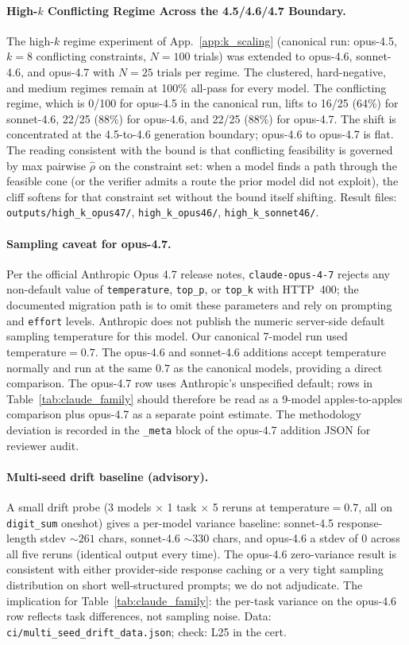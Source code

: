 \documentclass{article}
\theoremstyle{plain}
\theoremstyle{definition}
\theoremstyle{remark}
\newcommand{\appref}[1]{App.~\ref{#1}}
\begin{document}
\paragraph{High-$k$ Conflicting Regime Across the 4.5/4.6/4.7 Boundary.}
The high-$k$ regime experiment of \appref{app:k_scaling} (canonical run: opus-4.5, $k=8$ conflicting constraints, $N=100$ trials) was extended to opus-4.6, sonnet-4.6, and opus-4.7 with $N=25$ trials per regime. The clustered, hard-negative, and medium regimes remain at 100\% all-pass for every model. The conflicting regime, which is 0/100 for opus-4.5 in the canonical run, lifts to 16/25 (64\%) for sonnet-4.6, 22/25 (88\%) for opus-4.6, and 22/25 (88\%) for opus-4.7. The shift is concentrated at the 4.5-to-4.6 generation boundary; opus-4.6 to opus-4.7 is flat. The reading consistent with the bound is that conflicting feasibility is governed by max pairwise $\hat\rho$ on the constraint set: when a model finds a path through the feasible cone (or the verifier admits a route the prior model did not exploit), the cliff softens for that constraint set without the bound itself shifting. Result files: \texttt{outputs/high\_k\_opus47/}, \texttt{high\_k\_opus46/}, \texttt{high\_k\_sonnet46/}.

\paragraph{Sampling caveat for opus-4.7.}
Per the official Anthropic Opus 4.7 release notes, \texttt{claude-opus-4-7} rejects any non-default value of \texttt{temperature}, \texttt{top\_p}, or \texttt{top\_k} with HTTP~400; the documented migration path is to omit these parameters and rely on prompting and \texttt{effort} levels. Anthropic does not publish the numeric server-side default sampling temperature for this model. Our canonical 7-model run used temperature$=0.7$. The opus-4.6 and sonnet-4.6 additions accept temperature normally and run at the same $0.7$ as the canonical models, providing a direct comparison. The opus-4.7 row uses Anthropic's unspecified default; rows in Table~\ref{tab:claude_family} should therefore be read as a 9-model apples-to-apples comparison plus opus-4.7 as a separate point estimate. The methodology deviation is recorded in the \texttt{\_meta} block of the opus-4.7 addition JSON for reviewer audit.

\paragraph{Multi-seed drift baseline (advisory).} A small drift probe (3 models $\times$ 1 task $\times$ 5 reruns at temperature$=0.7$, all on \texttt{digit\_sum} oneshot) gives a per-model variance baseline: sonnet-4.5 response-length stdev $\sim 261$ chars, sonnet-4.6 $\sim 330$ chars, and opus-4.6 a stdev of $0$ across all five reruns (identical output every time). The opus-4.6 zero-variance result is consistent with either provider-side response caching or a very tight sampling distribution on short well-structured prompts; we do not adjudicate. The implication for Table~\ref{tab:claude_family}: the per-task variance on the opus-4.6 row reflects task differences, not sampling noise. Data: \texttt{ci/multi\_seed\_drift\_data.json}; check: L25 in the cert.
\end{document}
